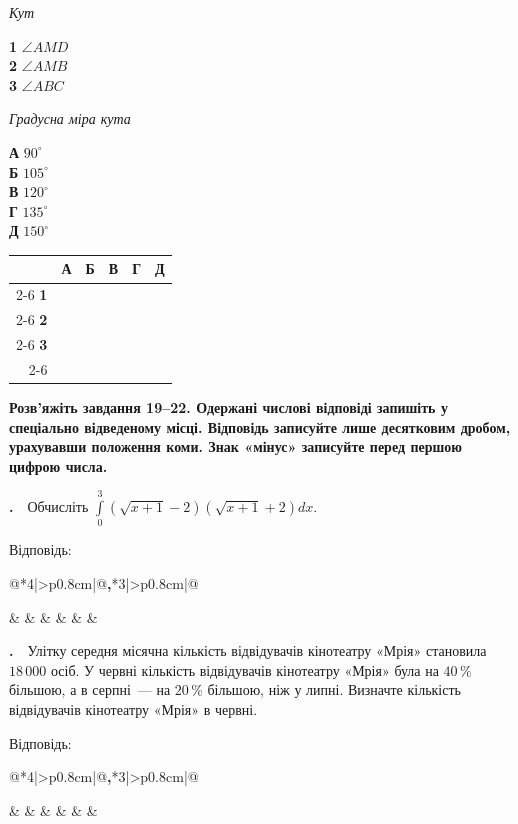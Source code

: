 \documentclass[12pt]{article}
\makeatletter
\newcommand{\instructionBox}[1]{%
\par\vspace{0.3cm}
\begin{tcolorbox}[colback=instrBg, colframe=instrBorder, boxrule=0.6pt, arc=2pt,
    left=8pt, right=8pt, top=4pt, bottom=4pt]
\centering\small\bfseries #1
\end{tcolorbox}
\par\vspace{0.15cm}
}
\newcommand{\nmtAnswerBox}{%
\par\vspace{0.2cm}\noindent
Відповідь:\ \ 
\begin{tabular}{@{}*{4}{|>{\centering\arraybackslash}p{0.8cm}}|@{\hspace{0.1cm}\textbf{,}\hspace{0.1cm}}*{3}{|>{\centering\arraybackslash}p{0.8cm}}|@{}}
\hline
\rule[-0.2cm]{0pt}{0.7cm} & & & & & & \\
\hline
\end{tabular}
\par\vspace{0.3cm}}
\newcommand{\matchingGrid}{%
    \begingroup
    \renewcommand{\arraystretch}{1.15}
    \setlength{\tabcolsep}{4pt}
    \footnotesize
    \begin{tabular}{r|c|c|c|c|c|}
         \multicolumn{1}{c}{} & \multicolumn{1}{c}{\textbf{А}} & \multicolumn{1}{c}{\textbf{Б}} & \multicolumn{1}{c}{\textbf{В}} & \multicolumn{1}{c}{\textbf{Г}} & \multicolumn{1}{c}{\textbf{Д}} \\ \cline{2-6}
         \textbf{1} & \phantom{X} & \phantom{X} & \phantom{X} & \phantom{X} & \phantom{X} \\ \cline{2-6}
         \textbf{2} & & & & & \\ \cline{2-6}
         \textbf{3} & & & & & \\ \cline{2-6}
    \end{tabular}
    \endgroup
}
\newcounter{zad}
\newcommand{\zadtask}[1]{\stepcounter{zad}\par\vspace{0.3cm}\noindent\textbf{\thezad.}\ \ #1\par\vspace{0.2cm}}
\makeatother
\begin{document}
{\vspace{0.2cm}
\noindent
\begin{minipage}[t]{0.42\textwidth}
\textit{Кут}\par\vspace{0.15cm}
\textbf{1} \quad $\angle AMD$\\[0.25cm]
\textbf{2} \quad $\angle AMB$\\[0.25cm]
\textbf{3} \quad $\angle ABC$
\end{minipage}
\hfill
\begin{minipage}[t]{0.32\textwidth}
\textit{Градусна міра кута}\par\vspace{0.15cm}
\textbf{А} \quad $90^\circ$\\[0.15cm]
\textbf{Б} \quad $105^\circ$\\[0.15cm]
\textbf{В} \quad $120^\circ$\\[0.15cm]
\textbf{Г} \quad $135^\circ$\\[0.15cm]
\textbf{Д} \quad $150^\circ$
\end{minipage}
\hfill
\begin{minipage}[t]{0.2\textwidth}
\vspace{0.4cm}
\begin{flushright}\matchingGrid\end{flushright}
\end{minipage}}
\newpage
\instructionBox{Розв'яжіть завдання 19--22. Одержані числові відповіді запишіть у спеціально відведеному місці. Відповідь записуйте лише десятковим дробом, урахувавши положення коми. Знак «мінус» записуйте перед першою цифрою числа.}

\zadtask{Обчисліть $\displaystyle\int\limits_{0}^{3} \left(\sqrt{x+1} - 2\right)\left(\sqrt{x+1} + 2\right)dx$.}
\nmtAnswerBox

\zadtask{Улітку середня місячна кількість відвідувачів кінотеатру «Мрія» становила $18\,000$ осіб. У червні кількість відвідувачів кінотеатру «Мрія» була на $40\,\%$ більшою, а в серпні~--- на $20\,\%$ більшою, ніж у липні. Визначте кількість відвідувачів кінотеатру «Мрія» в червні.}
\nmtAnswerBox
\end{document}
